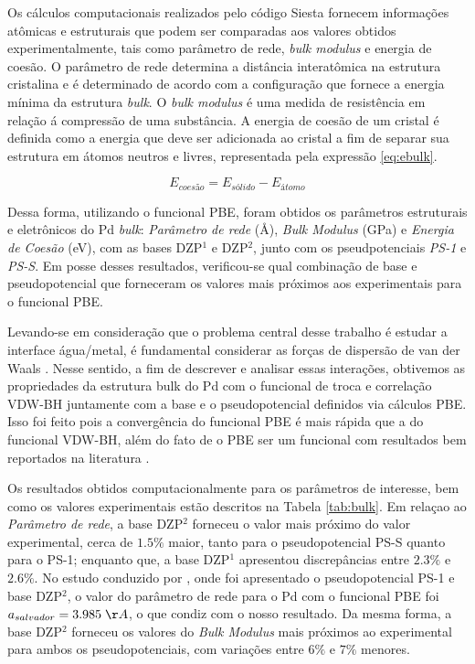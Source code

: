 Os cálculos computacionais realizados pelo código Siesta fornecem informações atômicas e estruturais que podem ser comparadas aos valores obtidos experimentalmente, tais como parâmetro de rede, \emph{bulk modulus} e energia de coesão. O parâmetro de rede determina a distância interatômica na estrutura cristalina e é determinado de acordo com a configuração que fornece a energia mínima da estrutura \emph{bulk}. O \emph{bulk modulus} é uma medida de resistência em relação á compressão de uma substância. A energia de coesão de um cristal é definida como a energia que deve ser adicionada ao cristal a fim de separar sua estrutura em átomos neutros e livres, representada pela expressão \eqref{eq:ebulk}. \cite{kittel}

\begin{equation}\label{eq:ebulk}
	E_{coesão}=E_{sólido}-E_{átomo}
\end{equation}

Dessa forma, utilizando o funcional PBE, foram obtidos os parâmetros estruturais e eletrônicos do Pd \textit{bulk}: \textit{Parâmetro de rede} ($ \si{\angstrom} $), \textit{Bulk Modulus} (GPa) e \textit{Energia de Coesão} (eV), com as bases DZP$ ^1 $ e DZP$^2 $, junto com os pseudpotenciais \textit{PS-1} e \textit{PS-S}. Em posse desses resultados, verificou-se qual combinação de base e pseudopotencial que forneceram os valores mais próximos aos experimentais para o funcional PBE. 

Levando-se em consideração que o problema central desse trabalho é estudar a interface água/metal, é fundamental considerar as forças de dispersão de van der Waals \cite{vdw-func}. Nesse sentido, a fim de descrever e analisar essas interações, obtivemos as propriedades da estrutura bulk do Pd com o funcional de troca e correlação VDW-BH juntamente com a base e o pseudopotencial definidos via cálculos PBE. Isso foi feito pois a convergência do funcional PBE é mais rápida que a do funcional VDW-BH, além do fato de o PBE ser um funcional com resultados bem reportados na literatura \cite{adrien}. 

Os resultados obtidos computacionalmente para os parâmetros de interesse, bem como os valores experimentais estão descritos na Tabela \ref{tab:bulk}. Em relaçao ao \textit{Parâmetro de rede}, a base DZP$^2$ forneceu o valor mais próximo do valor experimental, cerca de $ 1.5\% $ maior, tanto para o pseudopotencial PS-S quanto para o PS-1; enquanto que, a base DZP$^1$ apresentou discrepâncias entre $ 2.3\% $ e $ 2.6\% $. No estudo conduzido por \citeauthor{pseudo_salvador}, onde foi apresentado o pseudopotencial PS-1 e base DZP$^2  $, o valor do parâmetro de rede para o Pd com o funcional PBE foi $ a_{salvador}=3.985\; \AA $, o que condiz com o nosso resultado. Da mesma forma, a base DZP$^2$ forneceu os valores do \textit{Bulk Modulus} mais próximos ao experimental para ambos os pseudopotenciais, com variações entre $6\%$ e $7\%$ menores.

